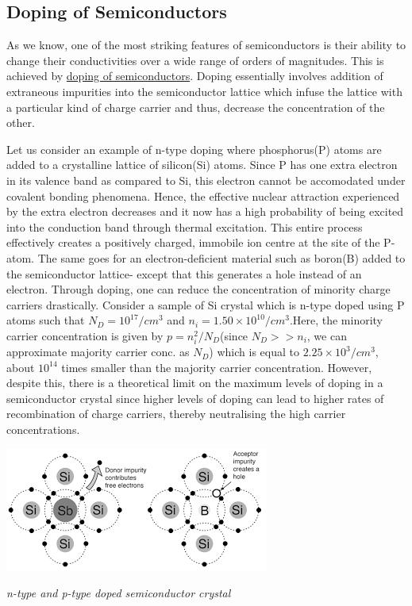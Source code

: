 \documentclass[12 pt]{article}
\begin{document}
\subsection{Doping of Semiconductors}

As we know, one of the most striking features of semiconductors is their ability to change their conductivities over a wide range of orders of magnitudes. This is achieved by \href{https://en.wikipedia.org/wiki/Doping_(semiconductor)#:~:text=In%20semiconductor%20production%2C%20doping%20is,to%20as%20an%20extrinsic%20semiconductor.}{doping of semiconductors}. Doping essentially involves addition of extraneous impurities into the semiconductor lattice which infuse the lattice with a particular kind of charge carrier and thus, decrease the concentration of the other. \par

Let us consider an example of n-type doping where phosphorus(P) atoms are added to a crystalline lattice of silicon(Si) atoms. Since P has one extra electron in its valence band as compared to Si, this electron cannot be accomodated under covalent bonding phenomena. Hence, the effective nuclear attraction experienced by the extra electron decreases and it now has a high probability of being excited into the conduction band through thermal excitation. This entire process effectively creates a positively charged, immobile ion centre at the site of the P-atom. The same goes for an electron-deficient material such as boron(B) added to the semiconductor lattice- except that this generates a hole instead of an electron. Through doping, one can reduce the concentration of minority charge carriers drastically. Consider a sample of Si crystal which is n-type doped using P atoms such that $N_{D} = 10^{17}/cm^{3}$ and $n_{i} = 1.50 \times 10^{10}/cm^{3} $.Here, the minority carrier concentration is given by $p = n_{i}^2/N_{D}$(since $N_{D} >> n_{i}$, we can approximate majority carrier conc. as $N_{D}$) which is equal to $2.25 \times 10^{3}/cm^{3}$, about $10^{14}$ times smaller than the majority carrier concentration. However, despite this, there is a theoretical limit on the maximum levels of doping in a semiconductor crystal since higher levels of doping can lead to higher rates of recombination of charge carriers, thereby neutralising the high carrier concentrations.\newline

  \par
   \begin{center}
   \includegraphics{download.png}
   \end{center}
    \begin{center}
      \emph{n-type and p-type doped semiconductor crystal}
  \end{center}
\par
\end{document}
